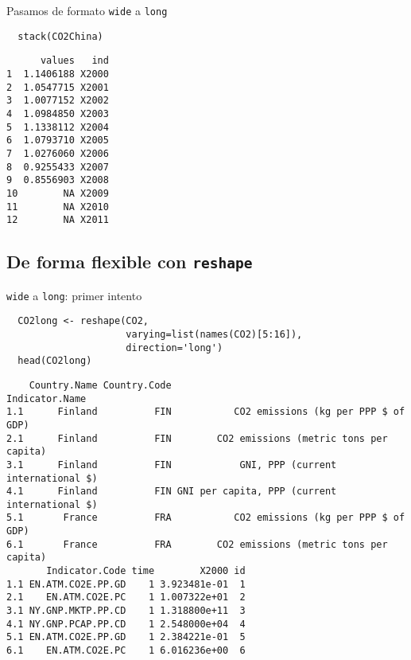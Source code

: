 \documentclass[xcolor={usenames,svgnames,dvipsnames}]{beamer}
\begin{document}
\begin{frame}[fragile,label=sec-3-1-2]{Pasamos de formato \texttt{wide} a \texttt{long}}
 \lstset{language=R,label= ,caption= ,numbers=none}
\begin{lstlisting}
  stack(CO2China)
\end{lstlisting}

\begin{verbatim}
      values   ind
1  1.1406188 X2000
2  1.0547715 X2001
3  1.0077152 X2002
4  1.0984850 X2003
5  1.1338112 X2004
6  1.0793710 X2005
7  1.0276060 X2006
8  0.9255433 X2007
9  0.8556903 X2008
10        NA X2009
11        NA X2010
12        NA X2011
\end{verbatim}
\end{frame}

\subsection{De forma flexible con \texttt{reshape}}
\label{sec-3-2}
\begin{frame}[fragile,label=sec-3-2-1]{\texttt{wide} a \texttt{long}: primer intento}
 \lstset{language=R,label= ,caption= ,numbers=none}
\begin{lstlisting}
  CO2long <- reshape(CO2,
                     varying=list(names(CO2)[5:16]),
                     direction='long')
  head(CO2long)
\end{lstlisting}

\begin{verbatim}
    Country.Name Country.Code                                Indicator.Name
1.1      Finland          FIN           CO2 emissions (kg per PPP $ of GDP)
2.1      Finland          FIN        CO2 emissions (metric tons per capita)
3.1      Finland          FIN            GNI, PPP (current international $)
4.1      Finland          FIN GNI per capita, PPP (current international $)
5.1       France          FRA           CO2 emissions (kg per PPP $ of GDP)
6.1       France          FRA        CO2 emissions (metric tons per capita)
       Indicator.Code time        X2000 id
1.1 EN.ATM.CO2E.PP.GD    1 3.923481e-01  1
2.1    EN.ATM.CO2E.PC    1 1.007322e+01  2
3.1 NY.GNP.MKTP.PP.CD    1 1.318800e+11  3
4.1 NY.GNP.PCAP.PP.CD    1 2.548000e+04  4
5.1 EN.ATM.CO2E.PP.GD    1 2.384221e-01  5
6.1    EN.ATM.CO2E.PC    1 6.016236e+00  6
\end{verbatim}
\end{frame}
\end{document}
